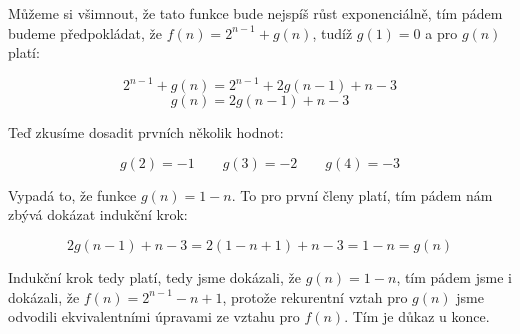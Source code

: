 \documentclass{fkssolpub}
\author{Ondřej Sedláček}
\begin{document}
Můžeme si všimnout, že tato funkce bude nejspíš růst exponenciálně, tím pádem budeme předpokládat, že $f(n) = 2^{n - 1} + g(n)$, tudíž $g(1) = 0$ a pro $g(n)$ platí:

\[
	2^{n - 1} + g(n) = 2^{n - 1} + 2 g(n - 1) + n - 3
\]
\[
	g(n) = 2 g(n - 1) + n - 3
\]

Teď zkusíme dosadit prvních několik hodnot:

\[
	g(2) = -1 \qquad g(3) = -2 \qquad g(4) = -3
\]

Vypadá to, že funkce $g(n) = 1 - n$. To pro první členy platí, tím pádem nám zbývá dokázat indukční krok:

\[
	2 g(n - 1) + n - 3 = 2 (1 - n + 1) + n - 3 = 1 - n = g(n)
\]

Indukční krok tedy platí, tedy jsme dokázali, že $g(n) = 1 - n$, tím pádem jsme i dokázali, že $f(n) = 2^{n - 1} - n + 1$, protože rekurentní vztah pro $g(n)$ jsme odvodili ekvivalentními úpravami ze vztahu pro $f(n)$. Tím je důkaz u konce.
\end{document}
